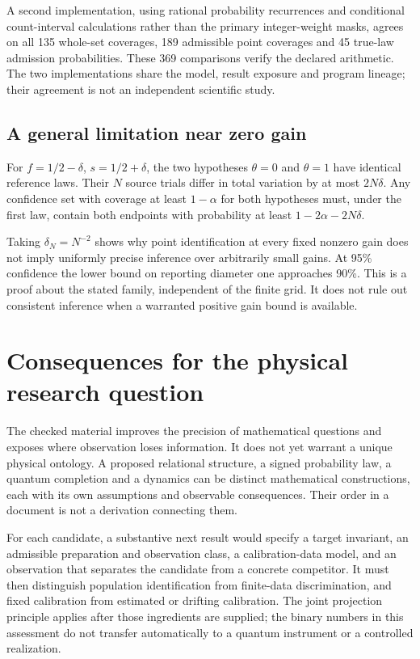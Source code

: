 \documentclass[11pt,a4paper]{article}
\begin{document}
A second implementation, using rational probability recurrences and conditional count-interval calculations rather than the primary integer-weight masks, agrees on all 135 whole-set coverages, 189 admissible point coverages and 45 true-law admission probabilities. These 369 comparisons verify the declared arithmetic. The two implementations share the model, result exposure and program lineage; their agreement is not an independent scientific study.

\subsection{A general limitation near zero gain}
For $f=1/2-\delta$, $s=1/2+\delta$, the two hypotheses $\theta=0$ and $\theta=1$ have identical reference laws. Their $N$ source trials differ in total variation by at most $2N\delta$. Any confidence set with coverage at least $1-\alpha$ for both hypotheses must, under the first law, contain both endpoints with probability at least $1-2\alpha-2N\delta$.

Taking $\delta_N=N^{-2}$ shows why point identification at every fixed nonzero gain does not imply uniformly precise inference over arbitrarily small gains. At 95\% confidence the lower bound on reporting diameter one approaches 90\%. This is a proof about the stated family, independent of the finite grid. It does not rule out consistent inference when a warranted positive gain bound is available.

\section{Consequences for the physical research question}

The checked material improves the precision of mathematical questions and exposes where observation loses information. It does not yet warrant a unique physical ontology. A proposed relational structure, a signed probability law, a quantum completion and a dynamics can be distinct mathematical constructions, each with its own assumptions and observable consequences. Their order in a document is not a derivation connecting them.

For each candidate, a substantive next result would specify a target invariant, an admissible preparation and observation class, a calibration-data model, and an observation that separates the candidate from a concrete competitor. It must then distinguish population identification from finite-data discrimination, and fixed calibration from estimated or drifting calibration. The joint projection principle applies after those ingredients are supplied; the binary numbers in this assessment do not transfer automatically to a quantum instrument or a controlled realization.
\end{document}
